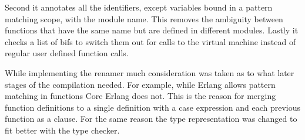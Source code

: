 Second it annotates all the identifiers, except variables bound in a pattern matching scope, with the module name. This removes the ambiguity between functions that have the same name but are defined in different modules. Lastly it checks a list of \glspl{bif} to switch them out for calls to the virtual machine instead of regular user defined function calls.

While implementing the renamer much consideration was taken as to what later stages of the compilation needed. For example, while Erlang allows pattern matching in functions Core Erlang does not. This is the reason for merging function definitions to a single definition with a case expression and each previous function as a clause. For the same reason the type representation was changed to fit better with the type checker.
